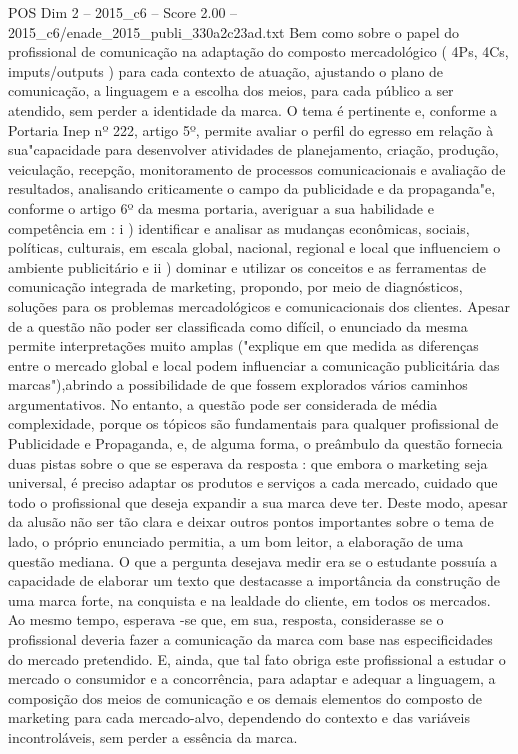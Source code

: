 \begin{textsample}{POS Dim 2 – 2015\_c6 – Score 2.00 – 2015\_c6/enade\_2015\_publi\_330a2c23ad.txt}
Bem como sobre o papel do profissional de comunicação na adaptação do composto mercadológico ( 4Ps, 4Cs, imputs/outputs ) para cada contexto de atuação, ajustando o plano de comunicação, a linguagem e a escolha dos meios, para cada público a ser atendido, sem perder a identidade da marca.
O tema é pertinente e, conforme a Portaria Inep nº 222, artigo 5º, permite avaliar o perfil do egresso em relação à sua"capacidade para desenvolver atividades de planejamento, criação, produção, veiculação, recepção, monitoramento de processos comunicacionais e avaliação de resultados, analisando criticamente o campo da publicidade e da propaganda"e, conforme o artigo 6º da mesma portaria, averiguar a sua habilidade e competência em : i ) identificar e analisar as mudanças econômicas, sociais, políticas, culturais, em escala global, nacional, regional e local que influenciem o ambiente publicitário e ii ) dominar e utilizar os conceitos e as ferramentas de comunicação integrada de marketing, propondo, por meio de diagnósticos, soluções para os problemas mercadológicos e comunicacionais dos clientes.
Apesar de a questão não poder ser classificada como difícil, o enunciado da mesma permite interpretações muito amplas ("explique em que medida as diferenças entre o mercado global e local podem influenciar a comunicação publicitária das marcas"),abrindo a possibilidade de que fossem explorados vários caminhos argumentativos.
No entanto, a questão pode ser considerada de média complexidade, porque os tópicos são fundamentais para qualquer profissional de Publicidade e Propaganda, e, de alguma forma, o preâmbulo da questão fornecia duas pistas sobre o que se esperava da resposta : que embora o marketing seja universal, é preciso adaptar os produtos e serviços a cada mercado, cuidado que todo o profissional que deseja expandir a sua marca deve ter.
Deste modo, apesar da alusão não ser tão clara e deixar outros pontos importantes sobre o tema de lado, o próprio enunciado permitia, a um bom leitor, a elaboração de uma questão mediana.
O que a pergunta desejava medir era se o estudante possuía a capacidade de elaborar um texto que destacasse a importância da construção de uma marca forte, na conquista e na lealdade do cliente, em todos os mercados.
Ao mesmo tempo, esperava -se que, em sua, resposta, considerasse se o profissional deveria fazer a comunicação da marca com base nas especificidades do mercado pretendido.
E, ainda, que tal fato obriga este profissional a estudar o mercado o consumidor e a concorrência, para adaptar e adequar a linguagem, a composição dos meios de comunicação e os demais elementos do composto de marketing para cada mercado-alvo, dependendo do contexto e das variáveis incontroláveis, sem perder a essência da marca.

\end{textsample}
